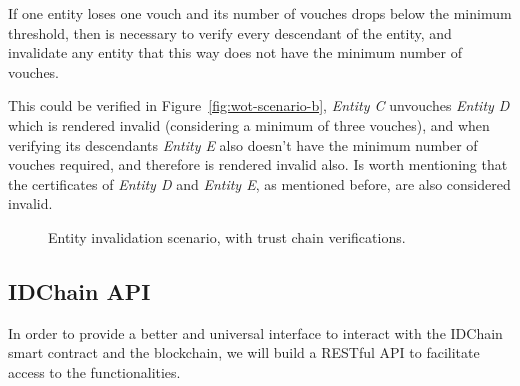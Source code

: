 If one entity loses one vouch and its number of vouches drops below the minimum threshold, then is necessary to verify every descendant of the entity, and invalidate any entity that this way does not have the minimum number of vouches.

This could be verified in Figure~\ref{fig:wot-scenario-b}, \textit{Entity C} unvouches \textit{Entity D} which is rendered invalid (considering a minimum of three vouches), and when verifying its descendants \textit{Entity E} also doesn't have the minimum number of vouches required, and therefore is rendered invalid also.
Is worth mentioning that the certificates of \textit{Entity D} and \textit{Entity E}, as mentioned before, are also considered invalid.

\begin{figure}[htb]
  \centering
  \caption{Entity invalidation scenario, with trust chain verifications.}
\end{figure}

\subsection{IDChain \ac{API}}

In order to provide a better and universal interface to interact with the IDChain smart contract and the blockchain, we will build a RESTful \ac{API} to facilitate access to the functionalities.

